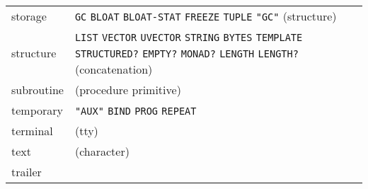 \documentclass[a4paper]{scrbook}
\begin{document}
\begin{longtable}[]{@{}ll@{}}
\begin{minipage}[t]{0.11\columnwidth}
storage\strut
\end{minipage} & \begin{minipage}[t]{0.83\columnwidth}\raggedright\strut
\texttt{GC} \texttt{BLOAT} \texttt{BLOAT-STAT} \texttt{FREEZE} \texttt{TUPLE} \texttt{"GC"} (structure)\strut
\end{minipage}\tabularnewline
\begin{minipage}[t]{0.11\columnwidth}\raggedright\strut
structure\strut
\end{minipage} & \begin{minipage}[t]{0.83\columnwidth}\raggedright\strut
\texttt{LIST} \texttt{VECTOR} \texttt{UVECTOR} \texttt{STRING} \texttt{BYTES} \texttt{TEMPLATE} \texttt{STRUCTURED?}
\texttt{EMPTY?} \texttt{MONAD?} \texttt{LENGTH} \texttt{LENGTH?} (concatenation)\strut
\end{minipage}\tabularnewline
\begin{minipage}[t]{0.11\columnwidth}\raggedright\strut
subroutine\strut
\end{minipage} & \begin{minipage}[t]{0.83\columnwidth}\raggedright\strut
(procedure primitive)\strut
\end{minipage}\tabularnewline
\begin{minipage}[t]{0.11\columnwidth}\raggedright\strut
temporary\strut
\end{minipage} & \begin{minipage}[t]{0.83\columnwidth}\raggedright\strut
\texttt{"AUX"} \texttt{BIND} \texttt{PROG} \texttt{REPEAT}\strut
\end{minipage}\tabularnewline
\begin{minipage}[t]{0.11\columnwidth}\raggedright\strut
terminal\strut
\end{minipage} & \begin{minipage}[t]{0.83\columnwidth}\raggedright\strut
(tty)\strut
\end{minipage}\tabularnewline
\begin{minipage}[t]{0.11\columnwidth}\raggedright\strut
text\strut
\end{minipage} & \begin{minipage}[t]{0.83\columnwidth}\raggedright\strut
(character)\strut
\end{minipage}\tabularnewline
\begin{minipage}[t]{0.11\columnwidth}\raggedright\strut
trailer\strut
\end{minipage} & \begin{minipage}[t]{0.83\columnwidth}\raggedright\strut

\end{minipage}
\end{longtable}
\end{document}

